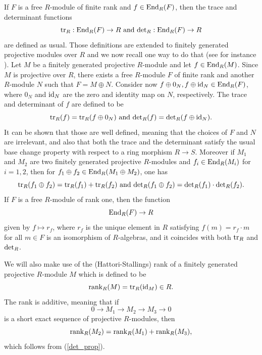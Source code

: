 \documentclass[11pt]{amsart}
\numberwithin{equation}{section}
\theoremstyle{remark}
\theoremstyle{definition}
\begin{document}
If $F$ is a free $R$-module of finite rank and $f \in {\rm End}_{R}(F)$, then the trace and determinant functions
\begin{equation} \label{tr_and_det}
{\rm tr}_{R}:{\rm End}_{R}(F) \rightarrow R \text{ and } {\rm det}_{R}:{\rm End}_{R}(F) \rightarrow R
\end{equation}
are defined as usual.  Those definitions are extended to finitely generated projective modules over $R$ and we now recall one way to do that (see for instance \cite{Goldman:1961}).  Let $M$ be a finitely generated projective $R$-module and let $f \in {\rm End}_{R}(M)$.  Since $M$ is projective over $R$, there exists a free $R$-module $F$ of finite rank and another $R$-module $N$ such that $F = M \oplus N$.  Consider now $f \oplus 0_{N}, f \oplus {\rm id}_{N} \in {\rm End}_{R}(F)$, where $0_{N}$ and ${\rm id}_{N}$ are the zero and identity map on $N$, respectively.  The trace and determinant of $f$ are defined to be
$${\rm tr}_{R}(f) = {\rm tr}_{R}(f \oplus 0_{N}) \text{ and } {\rm det}_{R}(f) = {\rm det}_{R}(f \oplus {\rm id}_{N}).$$
It can be shown that those are well defined, meaning that the choices of $F$ and $N$ are irrelevant, and also that both the trace and the determinant satisfy the usual base change property with respect to a ring morphism $R \rightarrow S$.  Moreover if $M_{1}$ and $M_{2}$ are two finitely generated projective $R$-modules and $f_{i} \in {\rm End}_{R}(M_{i})$ for $i=1,2$, then for $f_{1} \oplus f_{2} \in {\rm End}_{R}(M_{1} \oplus M_{2})$, one has
\begin{equation} \label{det_prop}
{\rm tr}_{R}(f_{1} \oplus f_{2}) = {\rm tr}_{R}(f_{1}) + {\rm tr}_{R}(f_{2}) \text{ and } {\rm det}_{R}(f_{1} \oplus f_{2}) = {\rm det}_{R}(f_{1}) \cdot {\rm det}_{R}(f_{2}).
\end{equation}
If $F$ is a free $R$-module of rank one, then the function 
\begin{equation}\label{simple_but_useful}
{\rm End}_{R}(F) \rightarrow R
\end{equation}
given by $f \mapsto r_{f}$, where $r_{f}$ is the unique element in $R$ satisfying $f(m) = r_{f} \cdot m$ for all $m \in F$ is an isomorphism of $R$-algebras, and it coincides with both ${\rm tr}_{R}$ and ${\rm det}_{R}$.


We will also make use of the (Hattori-Stallings) rank of a finitely generated projective $R$-module $M$ which is defined to be
$${\rm rank}_{R}(M) = {\rm tr}_{R}({\rm id}_{M}) \in R. $$
The rank is additive, meaning that if 
$$0 \rightarrow M_{1} \rightarrow M_{2} \rightarrow M_{3} \rightarrow 0 $$
is a short exact sequence of projective $R$-modules, then
$${\rm rank}_{R}(M_{2}) = {\rm rank}_{R}(M_{1}) + {\rm rank}_{R}(M_{3}), $$
which follows from (\ref{det_prop}).
\end{document}
